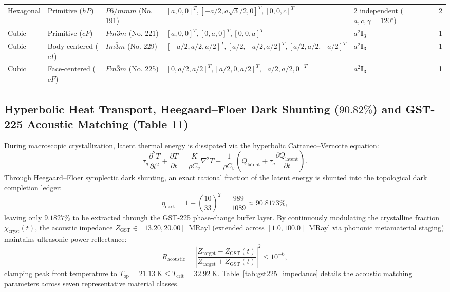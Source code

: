 \documentclass[11pt,onecolumn]{article}
\begin{document}
\begin{table}[!htbp]
{\begin{tabular}{@{}llllll@{}}
Hexagonal & Primitive ($hP$) & $P6/mmm$ (No. 191) & $[a,0,0]^T, [-a/2, a\sqrt{3}/2, 0]^T, [0,0,c]^T$ & 2 independent ($a,c,\gamma=120^\circ$) & 2 \\
Cubic & Primitive ($cP$) & $Pm\bar{3}m$ (No. 221) & $[a,0,0]^T, [0,a,0]^T, [0,0,a]^T$ & $a^2 \mathbf{I}_3$ & 1 \\
Cubic & Body-centered ($cI$) & $Im\bar{3}m$ (No. 229) & $[-a/2, a/2, a/2]^T, [a/2,-a/2, a/2]^T, [a/2, a/2,-a/2]^T$ & $a^2 \mathbf{I}_3$ & 1 \\
Cubic & Face-centered ($cF$) & $Fm\bar{3}m$ (No. 225) & $[0, a/2, a/2]^T, [a/2, 0, a/2]^T, [a/2, a/2, 0]^T$ & $a^2 \mathbf{I}_3$ & 1 \\
\bottomrule
\end{tabular}%
}
\end{table}
\FloatBarrier
\subsection{\texorpdfstring{Hyperbolic Heat Transport, Heegaard--Floer Dark Shunting ($90.82\%$) and GST-225 Acoustic Matching (Table 11)}{Hyperbolic Heat Transport, Heegaard--Floer Dark Shunting (90.82\%) and GST-225 Acoustic Matching (Table 11)}}
During macroscopic crystallization, latent thermal energy is dissipated via the hyperbolic Cattaneo--Vernotte equation:
\begin{equation}
\tau_q \frac{\partial^2 T}{\partial t^2} + \frac{\partial T}{\partial t} = \frac{K}{\rho C_v} \nabla^2 T + \frac{1}{\rho C_v}\left(Q_{\text{latent}} + \tau_q \frac{\partial Q_{\text{latent}}}{\partial t}\right).
\label{eq:cattaneo_vernotte}
\end{equation}
Through Heegaard--Floer symplectic dark shunting, an exact rational fraction of the latent energy is shunted into the topological dark completion ledger:
\begin{equation}
\eta_{\text{dark}} = 1 - \left(\frac{10}{33}\right)^2 = \frac{989}{1089} \approx \mathbf{90.8173\%},
\label{eq:dark_shunting_fraction}
\end{equation}
leaving only $9.1827\%$ to be extracted through the GST-225 phase-change buffer layer. By continuously modulating the crystalline fraction $\chi_{\text{cryst}}(t)$, the acoustic impedance $Z_{\text{GST}} \in [13.20, 20.00]$~MRayl (extended across $[1.0, 100.0]$~MRayl via phononic metamaterial staging) maintains ultrasonic power reflectance:
\begin{equation}
R_{\text{acoustic}} = \left| \frac{Z_{\text{target}} - Z_{\text{GST}}(t)}{Z_{\text{target}} + Z_{\text{GST}}(t)} \right|^2 \le 10^{-6},
\label{eq:acoustic_reflectance_limit}
\end{equation}
clamping peak front temperature to $T_{\text{op}} = 21.13~\text{K} \le T_{\text{crit}} = 32.92~\text{K}$. Table~\ref{tab:gst225_impedance} details the acoustic matching parameters across seven representative material classes.
\end{document}
